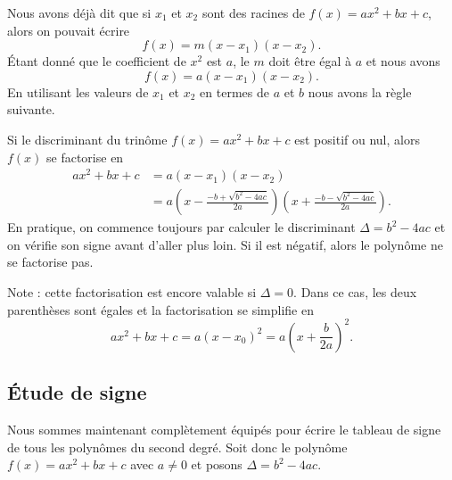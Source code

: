 Nous avons déjà dit que si \( x_1\) et \( x_2\) sont des racines de \( f(x)=ax^2+bx+c\), alors on pouvait écrire
\begin{equation}
    f(x)=m(x-x_1)(x-x_2).
\end{equation}
Étant donné que le coefficient de \( x^2\) est \( a\), le \( m\) doit être égal à \( a\) et nous avons
\begin{equation}
    f(x)=a(x-x_1)(x-x_2).
\end{equation}
En utilisant les valeurs de \( x_1\) et \( x_2\) en termes de \( a\) et \( b\) nous avons la règle suivante.
\begin{Aretenir}
    Si le discriminant du trinôme \( f(x)=ax^2+bx+c\) est positif ou nul, alors \( f(x)\) se factorise en
    \begin{subequations}
        \begin{align}
        ax^2+bx+c&=a(x-x_1)(x-x_2)\\
        &=a\left( x-\frac{ -b+\sqrt{b^2-4ac} }{ 2a } \right)\left( x+\frac{ -b-\sqrt{b^2-4ac} }{ 2a } \right).
        \end{align}
    \end{subequations}
    En pratique, on commence toujours par calculer le discriminant \( \Delta=b^2-4ac\) et on vérifie son signe avant d'aller plus loin. Si il est négatif, alors le polynôme ne se factorise pas.

    Note : cette factorisation est encore valable si \( \Delta=0\). Dans ce cas, les deux parenthèses sont égales et la factorisation se simplifie en
    \begin{equation}
        ax^2+bx+c=a(x-x_0)^2=a\left( x+\frac{ b }{ 2a } \right)^2.
    \end{equation}
\end{Aretenir}

\subsection{Étude de signe}

Nous sommes maintenant complètement équipés pour écrire le tableau de signe de tous les polynômes du second degré. Soit donc le polynôme \( f(x)=ax^2+bx+c\) avec \( a\neq 0\) et posons \( \Delta=b^2-4ac\).

